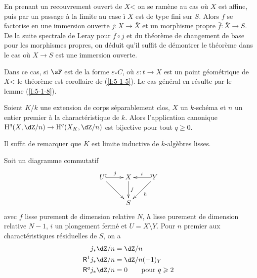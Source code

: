 En prenant un recouvrement ouvert de $X$< on se ramène au cas où $X$ est 
affine, puis par un passage à la limite au case \`i $X$ est de type fini sur 
$S$. Alors $f$ se factorise en une immersion ouverte $j:X\to \bar X$ et un 
morphisme propre $\bar f:\bar X\to S$. De la suite spectrale de Leray pour 
$\bar f\circ j$ et du théorème de changement de base pour les morphismes 
propres, on déduit qu'il suffit de démontrer le théorème dans le cas 
où $X\to S$ est une immersion ouverte. 

Dans ce cas, si $\sF$ est de la forme $\varepsilon_* C$, où 
$\varepsilon:t\to X$ est un point géométrique de $X$< le théorème est 
corollaire de (\ref{I:5-1-5}). Le cas général en résulte par le lemme 
(\ref{I:5-1-8}). 





\begin{corollary}\label{I:5-3-3}
Soient $K/k$ une extension de corps séparablement clos, $X$ un $k$-schéma 
et $n$ un entier premier à la charactéristique de $k$. Alors l'application 
canonique $\h^q(X,\dZ/n) \to \h^q(X_K,\dZ/n)$ est bijective pour tout 
$q\geqslant 0$. 
\end{corollary}

Il suffit de remarquer que $\bar K$ est limite inductive de $\bar k$-algèbres 
lisses. 





\begin{theorem}\label{I:5-3-4}
Soit un diagramme commutatif 
\begin{equation}\label{I:eq:5-3-4-1}\xymatrix{
  U \ar@{^{(}->}[r]^-j \ar[dr]
    & X \ar[d]^-f 
    & \ar@{_{(}->}[l]_-i Y \ar[dl]^-h \\
  & S
}\end{equation}
avec $f$ lisse purement de dimension relative $N$, $h$ lisse purement de 
dimension relative $N-1$, $i$ un plongement fermé et $U=X\setminus Y$. Pour 
$n$ premier aux charactéristiques résiduelles de $S$, on a 
\begin{equation*}
\begin{aligned}
  j_* \dZ/n     &= \dZ/n \\
  \R^1 j_*\dZ/n &= \dZ/n(-1)_Y \\
  \R^q j_*\dZ/n &= 0 \qquad \text{pour $q\geqslant 2$}
\end{aligned}
\end{equation*}
\end{theorem}

